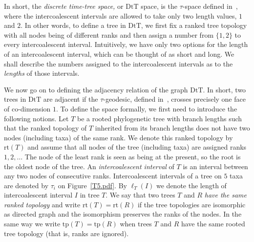 \documentclass{amsart}
\newcommand{\dts}{\mathrm{DtT}}
\newcommand{\rt}{\mathrm{rt}}
\newcommand{\tp}{\mathrm{tp}}
\begin{document}

In short, the {\em discrete time-tree space,} or $\dts$ space, is the $\tau$-space defined in~\cite{Gavryushkin2014-bw}, where the intercoalescent intervals are allowed to take only two length values, $1$ and $2$.
In other words, to define a tree in $\dts$, we first fix a ranked tree topology with all nodes being of different ranks and then assign a number from $\{1,2\}$ to every intercoalescent interval.
Intuitively, we have only two options for the length of an intercoalescent interval, which can be thought of as short and long.
We shall describe the numbers assigned to the intercoalescent intervals as to the {\em lengths} of those intervals.

We now go on to defining the adjacency relation of the graph $\dts$.
In short, two trees in $\dts$ are adjacent if the $\tau$-geodesic, defined in~\cite{Gavryushkin2014-bw}, crosses precisely one face of co-dimension $1$.
To define the space formally, we first need to introduce the following notions.
Let $T$ be a rooted phylogenetic tree with branch lengths such that the ranked topology of $T$ inherited from its branch lengths does not have two nodes (including taxa) of the same rank.
We denote this ranked topology by $\rt(T)$ and assume that all nodes of the tree (including taxa) are assigned ranks $1,2,\ldots$
The node of the least rank is seen as being at the present, so the root is the oldest node of the tree.
An {\em intercoalescent interval} of $T$ is an interval between any two nodes of consecutive ranks.
Intercoalescent intervals of a tree on $5$ taxa are denoted by $\tau_i$ on Figure~\ref{T5.pdf}.
By $\ell_T(I)$ we denote the length of intercoalescent interval $I$ in tree $T$.
We say that two trees $T$ and $R$ {\em have the same ranked topology} and write $\rt(T) = \rt(R)$ if the tree topologies are isomorphic as directed graph and the isomorphism preserves the ranks of the nodes.
In the same way we write $\tp(T) = \tp(R)$ when trees $T$ and $R$ have the same rooted tree topology (that is, ranks are ignored).
\end{document}
